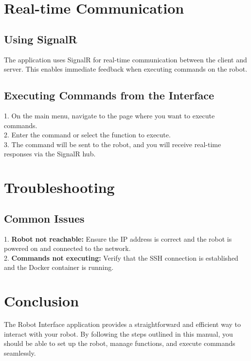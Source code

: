 \documentclass[12pt,a4paper]{scrbook}
\begin{document}
	\section{Real-time Communication}
	
	\subsection{Using SignalR}
	The application uses SignalR for real-time communication between the client and server. This enables immediate feedback when executing commands on the robot.
	
	\subsection{Executing Commands from the Interface}
	1. On the main menu, navigate to the page where you want to execute commands.\\
	2. Enter the command or select the function to execute.\\
	3. The command will be sent to the robot, and you will receive real-time responses via the SignalR hub.\\
	
	\section{Troubleshooting}
	
	\subsection{Common Issues}
	1. \textbf{Robot not reachable:} Ensure the IP address is correct and the robot is powered on and connected to the network.\\
	2. \textbf{Commands not executing:} Verify that the SSH connection is established and the Docker container is running.\\
	
	\section{Conclusion}
	The Robot Interface application provides a straightforward and efficient way to interact with your robot. By following the steps outlined in this manual, you should be able to set up the robot, manage functions, and execute commands seamlessly.
	
	
	
	\cleardoublepage
	\printbibliography
	
	\cleardoublepage
	
	
\end{document}
